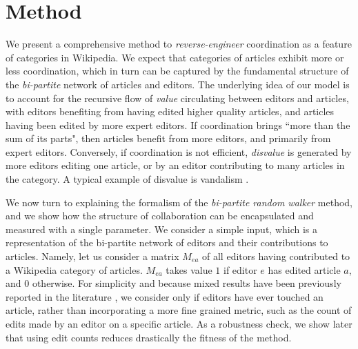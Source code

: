\section{Method}
\label{method}
We present a comprehensive method to {\it reverse-engineer} coordination as a feature of categories in Wikipedia.  We expect that categories of articles exhibit more or less coordination, which in turn can be captured by the fundamental structure of the {\it bi-partite} network of articles and editors. The underlying idea of our model is to account for the recursive flow of {\it value} circulating between editors and articles, with editors benefiting from having edited higher quality articles, and articles having been edited by more expert editors. If coordination brings ``more than the sum of its parts", then articles benefit from more editors, and primarily from expert editors. Conversely, if coordination is not efficient, {\it disvalue} is generated by more editors editing one article, or by an editor contributing to many articles in the category. A typical example of disvalue is vandalism \cite{geiger2013}.

We now turn to explaining the formalism of the {\it bi-partite random walker} method, and we show how the structure of collaboration can be encapsulated and measured with a single parameter. We consider a simple input, which is a representation of the bi-partite network of editors and their contributions to articles.  Namely, let us consider a matrix $M_{ea}$ of all editors having contributed to a Wikipedia category of articles. $M_{ea}$ takes value $1$ if editor $e$ has edited article $a$, and $0$ otherwise. For simplicity and because mixed results have been previously reported in the literature \cite{wilkinson2007}, we consider only if editors have ever touched an article, rather than incorporating a more fine grained metric, such as the count of edits made by an editor on a specific article. As a robustness check, we show later that using edit counts reduces drastically the fitness of the method.


